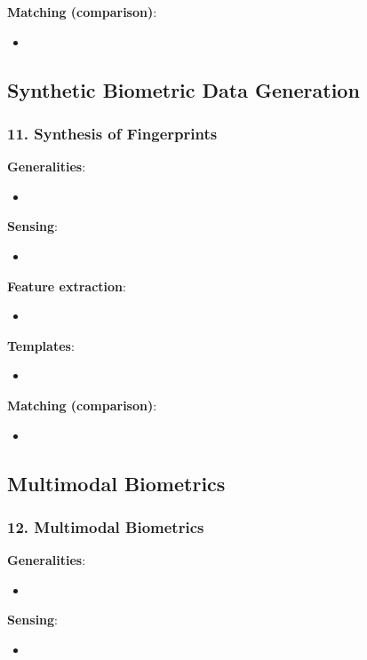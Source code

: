 \documentclass[a4paper]{article}
\begin{document}
      \textbf{Matching (comparison)}:
      \begin{itemize}
        \item 
      \end{itemize}
  \subsection*{Synthetic Biometric Data Generation}
    \subsubsection*{11. Synthesis of Fingerprints}
      \textbf{Generalities}:
      \begin{itemize}
        \item 
      \end{itemize}

      \textbf{Sensing}:
      \begin{itemize}
        \item 
      \end{itemize}

      \textbf{Feature extraction}:
      \begin{itemize}
        \item 
      \end{itemize}

      \textbf{Templates}:
      \begin{itemize}
        \item 
      \end{itemize}

      \textbf{Matching (comparison)}:
      \begin{itemize}
        \item 
      \end{itemize}
  \subsection*{Multimodal Biometrics}
    \subsubsection*{12. Multimodal Biometrics}
      \textbf{Generalities}:
      \begin{itemize}
        \item 
      \end{itemize}

      \textbf{Sensing}:
      \begin{itemize}
        \item 
      \end{itemize}
\end{document}
